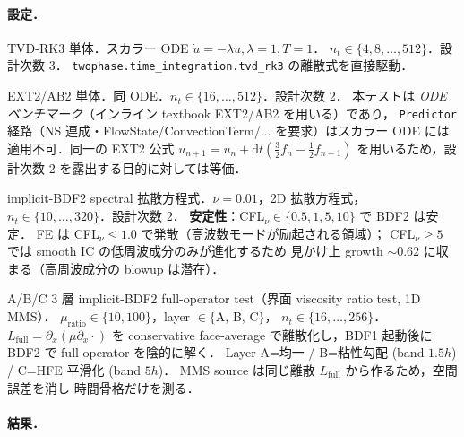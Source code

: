 \paragraph{設定．}
\begin{description}\setlength{\itemsep}{0pt}
  \item[U8-a] TVD-RK3 単体．スカラー ODE $\dot{u} = -\lambda u, \lambda=1, T=1$．
        $n_t \in \{4,8,\dots,512\}$．設計次数 3．
        \texttt{twophase.time\_integration.tvd\_rk3} の離散式を直接駆動．
  \item[U8-b] EXT2/AB2 単体．同 ODE．$n_t \in \{16,\dots,512\}$．設計次数 2．
        本テストは \emph{ODE ベンチマーク}（インライン textbook EXT2/AB2 を用いる）であり，
        \texttt{Predictor} 経路（NS 連成・FlowState/ConvectionTerm/...
        を要求）はスカラー ODE には適用不可．同一の EXT2 公式
        $u_{n+1} = u_n + \mathrm{d}t (\tfrac{3}{2} f_n - \tfrac{1}{2} f_{n-1})$
        を用いるため，設計次数 2 を露出する目的に対しては等価．
  \item[U8-c] implicit-BDF2 spectral 拡散方程式．$\nu = 0.01$，2D 拡散方程式，
        $n_t \in \{10,\dots,320\}$．設計次数 2．
        \textbf{安定性}：CFL$_\nu \in \{0.5,1,5,10\}$ で BDF2 は安定．
        FE は CFL$_\nu \le 1.0$ で発散（高波数モードが励起される領域）；
        CFL$_\nu \ge 5$ では smooth IC の低周波成分のみが進化するため
        見かけ上 growth $\sim 0.62$ に収まる（高周波成分の blowup は潜在）．
  \item[U8-d] A/B/C 3 層 implicit-BDF2 full-operator test（界面 viscosity ratio test, 1D MMS）．
        $\mu_{\mathrm{ratio}} \in \{10, 100\}$，layer $\in \{$A, B, C$\}$，
        $n_t \in \{16,\dots,256\}$．
        $L_{\mathrm{full}} = \partial_x(\mu \partial_x \cdot)$ を conservative face-average
        で離散化し，BDF1 起動後に BDF2 で full operator を陰的に解く．
        Layer A=均一 / B=粘性勾配 (band $1.5h$) / C=HFE 平滑化 (band $5h$)．
        MMS source は同じ離散 $L_{\mathrm{full}}$ から作るため，空間誤差を消し
        時間骨格だけを測る．
\end{description}

\paragraph{結果．}

